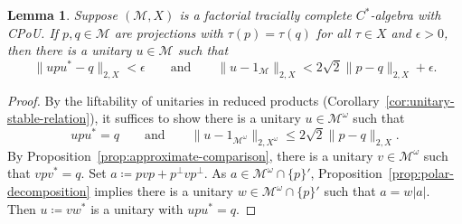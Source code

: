 \documentclass[a4paper,11pt]{amsart}
\newtheorem{lemma}[theorem]{Lemma}
\theoremstyle{definition}
\numberwithin{equation}{section}
\numberwithin{theorem}{section}
\newcommand{\M}{\mathcal{M}}
\begin{document}
\begin{lemma}\label{lem:equivalence-close-to-unit}
	Suppose $(\M, X)$ is a factorial tracially complete $C^*$-algebra with CPoU.  If $p, q \in \M$ are projections with $\tau(p) = \tau(q)$ for all $\tau \in X$ and $\epsilon > 0$, then there is a unitary $u \in \M$ such that
	\begin{equation}
		\| upu^* - q \|_{2, X} < \epsilon \qquad \text{and} \qquad \| u - 1_\M \|_{2, X} < 2 \sqrt{2} \|p - q\|_{2, X} + \epsilon.
	\end{equation}
\end{lemma}

\begin{proof}
	By the liftability of unitaries in reduced products (Corollary~\ref{cor:unitary-stable-relation}), it suffices to show there is a unitary $u \in \M^\omega$ such that
	\begin{equation}
		upu^* = q \qquad \text{and} \qquad \| u - 1_{\M^\omega}\|_{2, X^\omega} \leq 2 \sqrt{2} \|p - q\|_{2, X}.
	\end{equation}
	By Proposition~\ref{prop:approximate-comparison}, there is a unitary $v \in \M^\omega$ such that $vpv^* = q$.  Set $a \coloneqq pvp + p^\perp v p^\perp$. As $a \in \M^\omega \cap \{p\}'$, Proposition~\ref{prop:polar-decomposition} implies there is a unitary $w \in \M^\omega \cap \{p\}'$ such that $a = w|a|$.  Then $u \coloneqq vw^*$ is a unitary with $upu^* = q$.
	

\end{proof}
\end{document}
